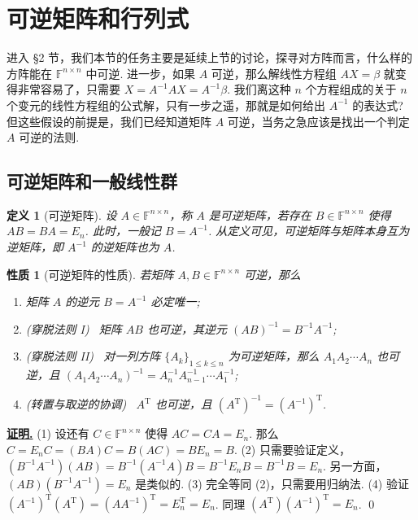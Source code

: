 \documentclass[10pt,openany]{article}
\theoremstyle{thmstyle} %
\theoremstyle{defstyle} %
\newtheorem{definition}[theorem]{定义}
\theoremstyle{prostyle} %
\newtheorem{property}[theorem]{性质}
\theoremstyle{exastyle}
\theoremstyle{remstyle}
\renewenvironment{proof}[1][证明]{\par\underline{\textbf{#1.}} \;\fangsong}{\qed\par}
\newcommand{\T}{^{\text{T}}}
\newcommand{\F}{\mathbb{F}}
\newcommand{\n}{^{n \times n}}
\begin{document}
\pagestyle{fancy}
\rhead{\today}

\setcounter{section}{1}
\section{可逆矩阵和行列式}

进入 \S 2 节，我们本节的任务主要是延续上节的讨论，探寻对方阵而言，什么样的方阵能在 \( \F\n \) 中可逆. 进一步，如果 \( A \) 可逆，那么解线性方程组 \( AX=\beta \) 就变得非常容易了，只需要 \( X=A^{-1}AX=A^{-1}\beta \). 我们离这种 \( n \) 个方程组成的关于 \( n \) 个变元的线性方程组的公式解，只有一步之遥，那就是如何给出 \( A^{-1} \) 的表达式?
但这些假设的前提是，我们已经知道矩阵 \( A \) 可逆，当务之急应该是找出一个判定 \( A \) 可逆的法则. 

\subsection{可逆矩阵和一般线性群}
\begin{definition}[可逆矩阵]
	设 \( A \in \F\n \)，称 \( A \) 是可逆矩阵，若存在 \( B \in \F\n \) 使得 \( AB=BA=E_n \). 此时，一般记 \( B=A^{-1} \). 从定义可见，可逆矩阵与矩阵本身互为逆矩阵，即 \( A^{-1} \) 的逆矩阵也为 \( A \).
	\label{2.1.1}
\end{definition}

\begin{property}[可逆矩阵的性质]
	若矩阵 \( A, B \in \F\n \) 可逆，那么
	\begin{enumerate}[(1)]
		\item 矩阵 \( A \) 的逆元 \( B=A^{-1} \) 必定唯一;
		\item (穿脱法则 I) \ 矩阵 \( AB \) 也可逆，其逆元 \( (AB)^{-1}=B^{-1}A^{-1} \);
		\item (穿脱法则 II) \ 对一列方阵 \( \{A_k\}_{1 \leq k \leq n} \) 为可逆矩阵，那么 \( A_1A_2\cdots A_n \) 也可逆，且 \( (A_1A_2\cdots A_n)^{-1}=A_n^{-1}A_{n-1}^{-1}\cdots A_1^{-1} \);
		\item (转置与取逆的协调) \ \( A\T \) 也可逆，且 \( (A\T)^{-1}=(A^{-1})\T \).
	\end{enumerate}
	\label{2.1.2}
\end{property}

\begin{proof}
	(1) 设还有 \( C \in \F\n \) 使得 \( AC=CA=E_n \). 那么 \( C=E_nC=(BA)C=B(AC)=BE_n=B \). (2) 只需要验证定义，\( (B^{-1}A^{-1})(AB)=B^{-1}(A^{-1}A)B=B^{-1}E_nB=B^{-1}B=E_n \). 另一方面，\( (AB)(B^{-1}A^{-1})=E_n \) 是类似的. (3) 完全等同 (2)，只需要用归纳法. (4) 验证 \( (A^{-1})\T(A\T)=(AA^{-1})\T=E_n\T=E_n \). 同理 \( (A\T)(A^{-1})\T= E_n \).
\end{proof}
\end{document}
